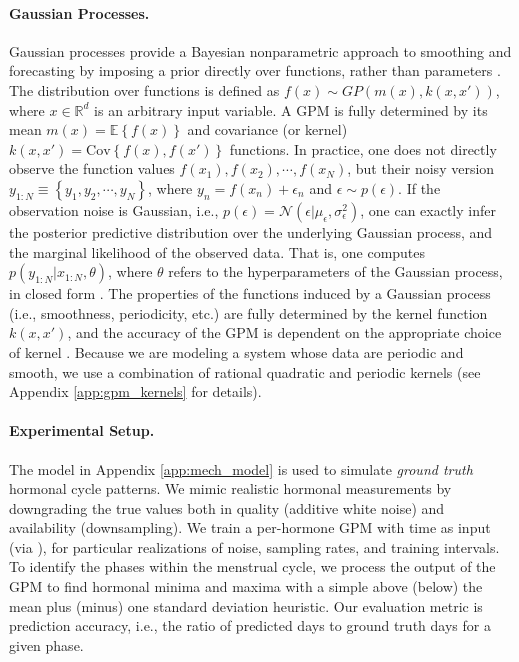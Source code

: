 \documentclass{article}
\def \Real{{\mathbb R}}
\newcommand{\eValue}[1]{\mathbb{E}\left\{ #1 \right\}}
\newcommand{\cov}{\textrm{Cov}}
\newcommand{\ie}{i.e., }
\newcommand{\N}{\mathcal{N}}
\begin{document}
\paragraph*{Gaussian Processes.} Gaussian processes provide a Bayesian nonparametric approach to smoothing and forecasting by imposing a prior directly over functions, rather than parameters \citep{ic-MacKay1998}. The distribution over functions is defined as $f(x) \sim GP\left(m(x), k(x,x')\right)$, where $x\in \Real^d$ is an arbitrary input variable. A GPM is fully determined by its mean $m(x)=\eValue{f(x)}$ and covariance (or kernel) $k(x,x')=\cov\left\{f(x), f(x')\right\}$ functions. In practice, one does not directly observe the function values $f(x_1), f(x_2),\cdots,f(x_N)$, but their noisy version $y_{1:N} \equiv \left\{y_1, y_2,\cdots,y_N\right\}$, where $y_n=f(x_n)+\epsilon_n$ and $\epsilon \sim p(\epsilon)$. If the observation noise is Gaussian, \ie $p(\epsilon)=\N\left(\epsilon |\mu_{\epsilon}, \sigma_{\epsilon}^2\right)$, one can exactly infer the posterior predictive distribution over the underlying Gaussian process, and the marginal likelihood of the observed data. That is, one computes $p(y_{1:N}|x_{1:N}, \theta)$, where $\theta$ refers to the
hyperparameters of the Gaussian process, in closed form \citep{b-Cressie1993, b-Stein1999, b-Rasmussen2006}. The properties of the functions induced by a Gaussian process (\ie smoothness, periodicity, etc.) are fully determined by the kernel function $k(x,x')$, and the accuracy of the GPM is dependent on the appropriate choice of kernel \citep{ic-MacKay1998,tr-Abrahamsen1997,b-Rasmussen2006}. Because we are modeling a system whose data are periodic and smooth, we use a combination of rational quadratic and periodic kernels (see Appendix \ref{app:gpm_kernels} for details).

\paragraph*{Experimental Setup.} The model in Appendix \ref{app:mech_model} is used to simulate \textit{ground truth} hormonal cycle patterns. We mimic realistic hormonal measurements by downgrading the true values both in quality (additive white noise) and availability (downsampling). We train a per-hormone GPM with time as input (via \citet{j-Neumann2015}), for particular realizations of noise, sampling rates, and training intervals. To identify the phases within the menstrual cycle, we process the output of the GPM to find hormonal minima and maxima with a simple above (below) the mean plus (minus) one standard deviation heuristic. Our evaluation metric is prediction accuracy, \ie the ratio of predicted days to ground truth days for a given phase.
\end{document}
